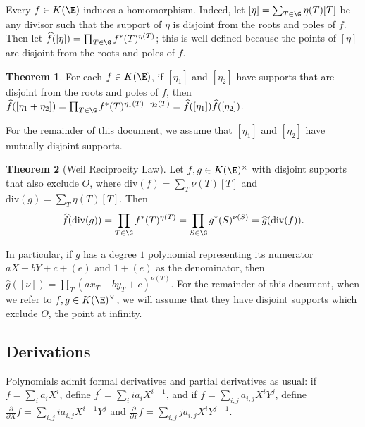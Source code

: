\documentclass[11pt,letterpaper]{article}
\newcommand{\dX}{\frac{\partial}{\partial X}}
\newcommand{\dY}{\frac{\partial}{\partial Y}}
\theoremstyle{definition}
\newtheorem{theorem}{Theorem}[subsection]
\newcommand{\6}{\mathbf}
\newcommand{\7}{\mathcal}
\begin{document}
Every $f \in K(\E)$ induces a homomorphism. Indeed, let $[\eta] = \sum_{T \in \G} \eta(T)[T]$ be any divisor such that the support of $\eta$ is disjoint from the roots and poles of $f$. Then let $\widehat{f}([\eta]) = \prod_{T\in \G} f^*(T)^{\eta(T)}$; this is well-defined because the points of $[\eta]$ are disjoint from the roots and poles of $f$.

\begin{theorem}
For each $f \in K(\E)$, if $[\eta_1]$ and $[\eta_2]$ have supports that are disjoint from the roots and poles of $f$, then $\widehat{f}([\eta_1+\eta_2]) = \prod_{T \in \G} f^*(T)^{\eta_1(T)+\eta_2(T)} = \widehat{f}([\eta_1])\widehat{f}([\eta_2])$.
\label{thm:inducedmaphom}
\end{theorem}


For the remainder of this document, we assume that $[\eta_1]$ and $[\eta_2]$ have mutually disjoint supports.


\begin{theorem}[Weil Reciprocity Law]
Let $f, g \in K(\E)^\times$ with disjoint supports that also exclude $O$, where $\text{div}(f) = \sum\limits_T \nu(T) [T]$ and $\text{div}(g) = \sum_T \eta(T) [T]$. Then \[\widehat{f}(\text{div}(g)) = \prod\limits_{T \in \G} f^*(T)^{\eta(T)} = \prod\limits_{S \in \G} g^*(S)^{\nu(S)} = \widehat{g}(\text{div}(f)).\] 
\end{theorem}

In particular, if $g$ has a degree $1$ polynomial representing its numerator $aX + bY + c + (e)$ and $1 + (e)$ as the denominator, then $\widehat{g}([\nu]) = \prod_T (ax_T + by_T + c)^{\nu(T)}$.
For the remainder of this document, when we refer to $f, g \in K(\E)^\times$, we will assume that they have disjoint supports which  exclude $O$, the point at infinity.



\subsection{Derivations}

Polynomials admit formal derivatives and partial derivatives as usual: if $f = \sum_i a_i X^i$, define $f^\prime = \sum_i i a_i X^{i-1}$, and if $f = \sum_{i,j} a_{i,j}X^i Y^j$, define $\dX f = \sum_{i,j} ia_{i,j}X^{i-1} Y^j$ and $\dY f = \sum_{i,j} ja_{i,j}X^iY^{j-1}$.
\end{document}
